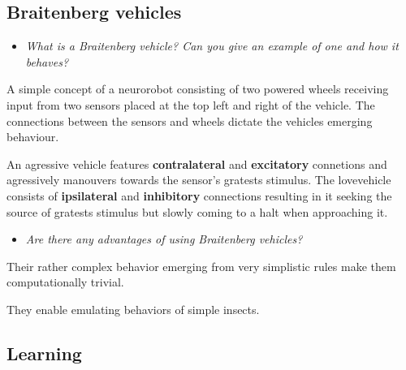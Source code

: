 \documentclass[
    fontsize      = 11pt,
    paper         = a4,
    twoside       = false,
    parskip       = half,
    pagesize      = false,
]{scrartcl}
\providecommand{\tightlist}{%
  \setlength{\itemsep}{0pt}\setlength{\parskip}{0pt}}
\begin{document}
\hypertarget{braitenberg-vehicles-1}{%
\subsection{Braitenberg vehicles}\label{braitenberg-vehicles-1}}

\begin{itemize}
\tightlist
\item
  \emph{What is a Braitenberg vehicle? Can you give an example of one
  and how it behaves?}
\end{itemize}

A simple concept of a neurorobot consisting of two powered wheels
receiving input from two sensors placed at the top left and right of the
vehicle. The connections between the sensors and wheels dictate the
vehicles emerging behaviour.

An agressive vehicle features \textbf{contralateral} and
\textbf{excitatory} connetions and agressively manouvers towards the
sensor's gratests stimulus. The \glqq love\grqq vehicle consists of
\textbf{ipsilateral} and \textbf{inhibitory} connections resulting in it
seeking the source of gratests stimulus but slowly coming to a halt when
approaching it.

\begin{itemize}
\tightlist
\item
  \emph{Are there any advantages of using Braitenberg vehicles?}
\end{itemize}

Their rather complex behavior emerging from very simplistic rules make
them computationally trivial.

They enable emulating behaviors of simple insects.

\hypertarget{learning}{%
\subsection{Learning}\label{learning}}
\end{document}
